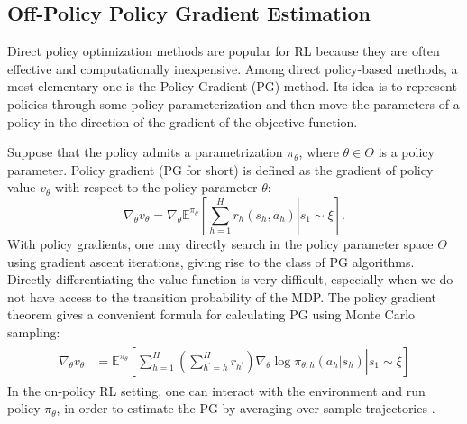 \documentclass{article}
\numberwithin{equation}{section}
\begin{document}
\subsection{Off-Policy Policy Gradient Estimation}



Direct policy optimization methods are popular for RL because they are often effective and computationally inexpensive. Among direct policy-based methods, a most elementary one is
the Policy Gradient (PG) method. Its idea is to
represent policies through some policy parameterization and then move the parameters of a policy in the direction of the gradient of the objective function.

Suppose that the policy admits a parametrization $\pi_{\theta}$, where $\theta\in\Theta$ is a policy parameter. Policy gradient (PG for short) is defined as the gradient of policy value $v_{\theta}$ with respect to the policy parameter $\theta$:
$$\nabla_{\theta} v_{\theta}= \nabla_{\theta} \mathbb{E}^{\pi_{\theta}}\left[\left.\sum_{h=1}^Hr_h(s_h, a_h)\right\vert s_1\sim\xi\right].$$
With policy gradients, one may directly search in the policy parameter space $\Theta$ using gradient ascent iterations, giving rise to the class of PG algorithms. 
Directly differentiating the value function is very difficult, especially when we do not have access to the transition probability of the MDP. 
The policy gradient theorem \cite{sutton2000policy} gives a convenient formula for calculating PG using Monte Carlo sampling:
\begin{align}
    \label{pg_thm}
    \begin{aligned}
    \nabla_\theta v_\theta &= \mathbb{E}^{\pi_\theta}\left[\left.\sum_{h=1}^H \left(\sum_{h^\prime=h}^H r_{h^\prime}\right)\nabla_\theta\log\pi_{\theta, h}\left(a_h\vert s_h\right)\right\vert s_1\sim\xi\right]
    \end{aligned}
\end{align}
In the on-policy RL setting, one can interact with the environment and run policy $\pi_{\theta}$, in order to estimate the PG by averaging over sample trajectories  \cite{degris2012off, kakade2001natural, peters2008natural,sutton2000policy, williams1992simple}. 
\end{document}
